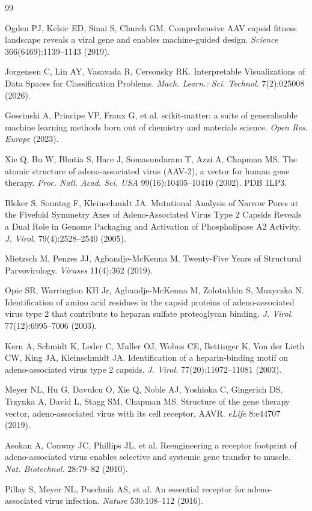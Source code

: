 \documentclass[11pt]{article}
\begin{document}
\begin{thebibliography}{99}

 Ogden PJ, Kelsic ED, Sinai S, Church GM. Comprehensive AAV
capsid fitness landscape reveals a viral gene and enables machine-guided design. \textit{Science}
366(6469):1139--1143 (2019).

 Jorgensen C, Lin AY, Vasavada R, Cersonsky RK.
Interpretable Visualizations of Data Spaces for Classification Problems. \textit{Mach. Learn.:
Sci. Technol.} 7(2):025008 (2026).

 Goscinski A, Principe VP, Fraux G, et al.
scikit-matter: a suite of generalisable machine learning methods born out of chemistry and
materials science. \textit{Open Res. Europe} (2023).

 Xie Q, Bu W, Bhatia S, Hare J, Somasundaram T, Azzi A,
Chapman MS. The atomic structure of adeno-associated virus (AAV-2), a vector for human gene
therapy. \textit{Proc. Natl. Acad. Sci. USA} 99(16):10405--10410 (2002). PDB 1LP3.

 Bleker S, Sonntag F, Kleinschmidt JA. Mutational
Analysis of Narrow Pores at the Fivefold Symmetry Axes of Adeno-Associated Virus Type 2 Capsids
Reveals a Dual Role in Genome Packaging and Activation of Phospholipase A2 Activity. \textit{J.
Virol.} 79(4):2528--2540 (2005).

 Mietzsch M, Penzes JJ, Agbandje-McKenna M.
Twenty-Five Years of Structural Parvovirology. \textit{Viruses} 11(4):362 (2019).

 Opie SR, Warrington KH Jr, Agbandje-McKenna M, Zolotukhin S,
Muzyczka N. Identification of amino acid residues in the capsid proteins of adeno-associated virus
type 2 that contribute to heparan sulfate proteoglycan binding. \textit{J. Virol.}
77(12):6995--7006 (2003).

 Kern A, Schmidt K, Leder C, Muller OJ, Wobus CE, Bettinger K,
Von der Lieth CW, King JA, Kleinschmidt JA. Identification of a heparin-binding motif on
adeno-associated virus type 2 capsids. \textit{J. Virol.} 77(20):11072--11081 (2003).

 Meyer NL, Hu G, Davulcu O, Xie Q, Noble AJ, Yoshioka C,
Gingerich DS, Trzynka A, David L, Stagg SM, Chapman MS. Structure of the gene therapy vector,
adeno-associated virus with its cell receptor, AAVR. \textit{eLife} 8:e44707 (2019).

 Asokan A, Conway JC, Phillips JL, et al. Reengineering a
receptor footprint of adeno-associated virus enables selective and systemic gene transfer to
muscle. \textit{Nat. Biotechnol.} 28:79--82 (2010).

 Pillay S, Meyer NL, Puschnik AS, et al. An essential
receptor for adeno-associated virus infection. \textit{Nature} 530:108--112 (2016).

\end{thebibliography}
\end{document}
